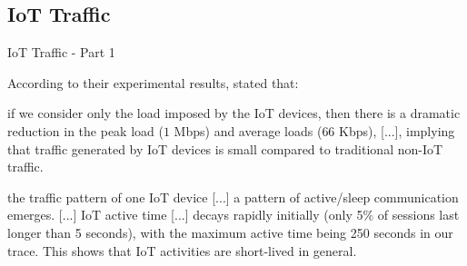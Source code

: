 \documentclass[10pt]{beamer}
\begin{document}
\subsection{IoT Traffic}
\begin{frame}{IoT Traffic - Part 1}

According to their experimental results, \citet{ITPAReport} stated that:

\begin{quoting}[font=itshape, begintext={``}, endtext={''\cite[par.~IV.A]{ITPAReport}}]
\justifying
[...] if we consider only the load imposed by the IoT devices, then there is a dramatic reduction in the peak load ($1$ Mbps) and average loads ($66$ Kbps), [...], implying that traffic generated by IoT devices is small compared to traditional non-IoT traffic. 
\end{quoting}

\begin{quoting}[font=itshape, begintext={``}, endtext={''\cite[par.~IV.A]{ITPAReport}}]
\justifying
the traffic pattern of one IoT device [...] a pattern of active/sleep communication emerges. [...] IoT active time [...] decays rapidly initially (only 5\% of sessions last longer than 5 seconds), with the maximum active time being 250 seconds in our trace. This shows that IoT activities are short-lived in general. 
\end{quoting}

\end{frame} 
\end{document}
